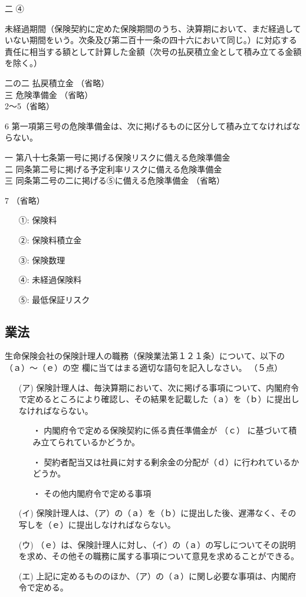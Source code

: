 \documentclass[report,gutter=10mm,fore-edge=10mm,uplatex,dvipdfmx]{jlreq}
\begin{document}
二 ④

未経過期間（保険契約に定めた保険期間のうち、決算期において、まだ経過していない期間をいう。次条及び第二百十一条の四十六において同じ。）に対応する責任に相当する額として計算した金額（次号の払戻積立金として積み立てる金額を除く。）

二の二 払戻積立金 （省略）\\
三 危険準備金 （省略）\\
2〜5（省略）

6 第一項第三号の危険準備金は、次に掲げるものに区分して積み立てなければならない。

一 第八十七条第一号に掲げる保険リスクに備える危険準備金\\
二 同条第二号に掲げる予定利率リスクに備える危険準備金\\
三 同条第二号の二に掲げる⑤に備える危険準備金
（省略）

7 （省略）
\answer{}

\begin{itemize}
\item[ ①:] 保険料
\item[ ②:] 保険料積立金
\item[ ③:] 保険数理
\item[ ④:] 未経過保険料
\item[ ⑤:] 最低保証リスク
\end{itemize}

\subsection{業法}
生命保険会社の保険計理人の職務（保険業法第１２１条）について、以下の（ａ）～（ｅ）の空
欄に当てはまる適切な語句を記入しなさい。
（５点）

\begin{itemize}
\item[(ア)] 保険計理人は、毎決算期において、次に掲げる事項について、内閣府令で定めるところにより確認し、その結果を記載した（ａ）を（ｂ）に提出しなければならない。
\begin{itemize}
\item[・]  内閣府令で定める保険契約に係る責任準備金が （ｃ） に基づいて積み立てられているかどうか。
\item[・]  契約者配当又は社員に対する剰余金の分配が（ｄ）に行われているかどうか。
\item[・]  その他内閣府令で定める事項
\end{itemize}
\item[(イ)] 保険計理人は、（ア）の（ａ）を（ｂ）に提出した後、遅滞なく、その写しを（ｅ）に提出しなければならない。
\item[(ウ)] （ｅ）は、保険計理人に対し、（イ）の（ａ）の写しについてその説明を求め、その他その職務に属する事項について意見を求めることができる。
\item[(エ)] 上記に定めるもののほか、（ア）の（ａ）に関し必要な事項は、内閣府令で定める。
\end{itemize}
\end{document}
